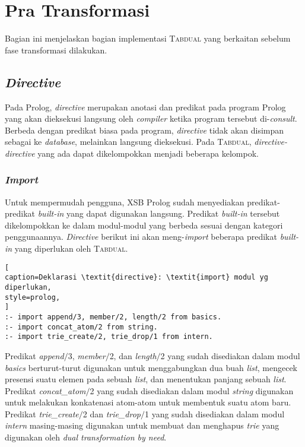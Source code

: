 \section{Pra Transformasi}

Bagian ini menjelaskan bagian implementasi \textsc{Tabdual} yang berkaitan sebelum fase transformasi dilakukan.

\subsection{\textit{Directive}}

Pada Prolog, \textit{directive} merupakan anotasi dan predikat pada program Prolog yang akan dieksekusi langsung oleh \textit{compiler} ketika program tersebut di-\textit{consult}. Berbeda dengan predikat biasa pada program, \textit{directive} tidak akan disimpan sebagai ke \textit{database}, melainkan langsung dieksekusi. Pada \textsc{Tabdual}, \textit{directive-directive} yang ada dapat dikelompokkan menjadi beberapa kelompok.

\subsubsection{\textit{Import}}

Untuk mempermudah pengguna, XSB Prolog sudah menyediakan predikat-predikat \textit{built-in} yang dapat digunakan langsung. Predikat \textit{built-in} tersebut dikelompokkan ke dalam modul-modul yang berbeda sesuai dengan kategori penggunaannya. \textit{Directive} berikut ini akan meng-\textit{import} beberapa predikat \textit{built-in} yang diperlukan oleh \textsc{Tabdual}.
\\

\begin{lstlisting}[
caption=Deklarasi \textit{directive}: \textit{import} modul yg diperlukan,
style=prolog,
]
:- import append/3, member/2, length/2 from basics.
:- import concat_atom/2 from string.
:- import trie_create/2, trie_drop/1 from intern.
\end{lstlisting}

Predikat \textit{append$/$}3, \textit{member$/$}2, dan \textit{length$/$}2 yang sudah disediakan dalam modul \textit{basics} berturut-turut digunakan untuk menggabungkan dua buah \textit{list}, mengecek presensi suatu elemen pada sebuah \textit{list}, dan menentukan panjang sebuah \textit{list}. Predikat \textit{concat\_atom$/$}2 yang sudah disediakan dalam modul \textit{string} digunakan untuk melakukan konkatenasi atom-atom untuk membentuk suatu atom baru. Predikat \textit{trie\_create$/$}2 dan \textit{trie\_drop$/$}1 yang sudah disediakan dalam modul \textit{intern} masing-masing digunakan untuk membuat dan menghapus \textit{trie} yang digunakan oleh \textit{dual transformation by need}.


